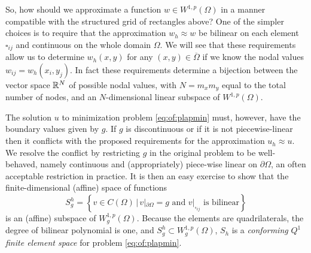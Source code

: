 So, how should we approximate a function $w \in W^{1,p}(\Omega)$ in a manner compatible with the structured grid of rectangles above?  One of the simpler choices is to require that the approximation $w_h \approx w$ be bilinear on each element $\square_{ij}$ and continuous on the whole domain $\Omega$.  We will see that these requirements allow us to determine $w_h(x,y)$ for any $(x,y)\in \overline\Omega$ if we know the nodal values $w_{ij} = w_h(x_i,y_j)$.  In fact these requirements determine a bijection between the vector space $\mathbb{R}^N$ of possible nodal values, with $N=m_x m_y$ equal to the total number of nodes, and an $N$-dimensional linear subspace of $W^{1,p}(\Omega)$.

The solution $u$ to minimization problem \eqref{eq:of:plapmin} must, however, have the boundary values given by $g$.  If $g$ is discontinuous or if it is not piecewise-linear then it conflicts with the proposed requirements for the approximation $u_h\approx u$.  We resolve the conflict by restricting $g$ in the original problem to be well-behaved, namely continuous and (appropriately) piece-wise linear on $\partial\Omega$, an often acceptable restriction in practice.  It is then an easy exercise to show that the finite-dimensional (affine) space of functions
\begin{equation}
S_g^h = \left\{v \in C(\Omega) \, \Big| \, v|_{\partial \Omega} = g \text{ and } v|_{\square_{ij}} \text{ is bilinear}\right\} \label{eq:of:Sghdefn}
\end{equation}
is an (affine) subspace of $W_g^{1,p}(\Omega)$.  Because the elements are quadrilaterals, the degree of bilinear polynomial is one, and $S_g^h \subset W_g^{1,p}(\Omega)$, $S_h$ is a \emph{conforming} $Q^1$ \emph{finite element space} \citep{Elmanetal2005} for problem \eqref{eq:of:plapmin}.

